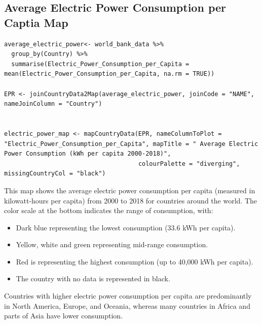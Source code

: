 \documentclass{article}\usepackage[]{graphicx}\usepackage[]{xcolor}
\begin{document}
\newpage
\subsection{Average Electric Power Consumption per Captia Map}
\begin{lstlisting}
average_electric_power<- world_bank_data %>%
  group_by(Country) %>%
  summarise(Electric_Power_Consumption_per_Capita = mean(Electric_Power_Consumption_per_Capita, na.rm = TRUE))

EPR <- joinCountryData2Map(average_electric_power, joinCode = "NAME", nameJoinColumn = "Country")


electric_power_map <- mapCountryData(EPR, nameColumnToPlot = "Electric_Power_Consumption_per_Capita", mapTitle = " Average Electric Power Consumption (kWh per capita 2000-2018)", 
                                     colourPalette = "diverging", missingCountryCol = "black")

\end{lstlisting}
This map shows the average electric power consumption per capita (measured in kilowatt-hours per capita) from 2000 to 2018 for countries around the world. The color scale at the bottom indicates the range of consumption, with:
\begin{itemize}
\item{Dark blue representing the lowest consumption (33.6 kWh per capita).}
\item{Yellow, white and green representing mid-range consumption.}
\item{Red is representing the highest consumption (up to 40,000 kWh per capita).}
\item{The country with no data is represented in black.}
\end{itemize}
Countries with higher electric power consumption per capita are predominantly in North America, Europe, and Oceania, whereas many countries in Africa and parts of Asia have lower consumption.
\end{document}
